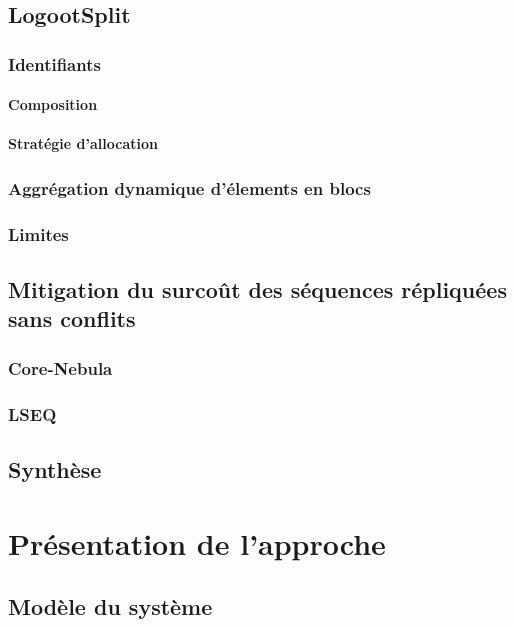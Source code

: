 \documentclass[12pt]{thesul}
\begin{document}
\section{LogootSplit}
\subsection{Identifiants}
\subsubsection{Composition}
\subsubsection{Stratégie d'allocation}
\subsection{Aggrégation dynamique d'élements en blocs}
\subsection{Limites}
\section{Mitigation du surcoût des séquences répliquées sans conflits}
\subsection{Core-Nebula}
\subsection{LSEQ}


\section{Synthèse}

% 

\NumberThisInToc
\chapter{Présentation de l'approche}
\minitoc
\section{Modèle du système}
\end{document}

